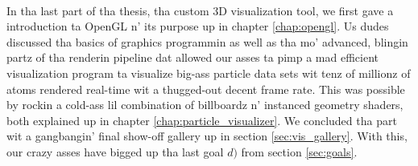 \\
In tha last part of tha thesis, tha custom 3D visualization tool, we first gave a introduction ta OpenGL n' its purpose up in chapter \ref{chap:opengl}. Us dudes discussed tha basics of graphics programmin as well as tha mo' advanced, blingin partz of tha renderin pipeline dat allowed our asses ta pimp a mad efficient visualization program ta visualize big-ass particle data sets wit tenz of millionz of atoms rendered real-time wit a thugged-out decent frame rate. This was possible by rockin a cold-ass lil combination of billboardz n' instanced geometry shaders, both explained up in chapter \ref{chap:particle_visualizer}. We concluded tha part wit a gangbangin' final show-off gallery up in section \ref{sec:vis_gallery}. With this, our crazy asses have  bigged up  tha last goal $d)$ from section \ref{sec:goals}. 